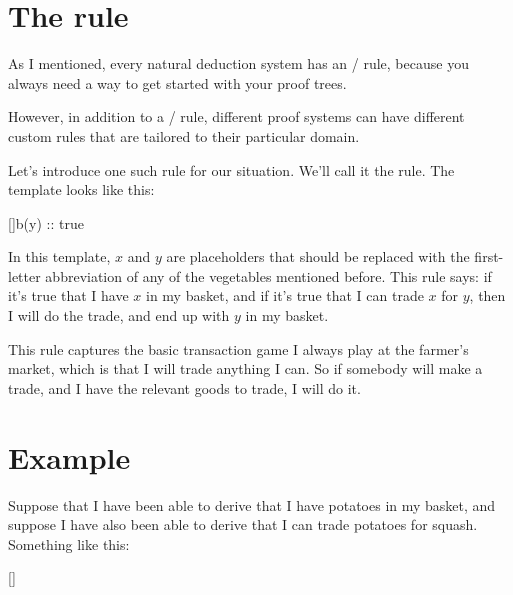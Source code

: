 \documentclass[../../../main.tex]{subfiles}
\begin{document}
\section{The  rule}

As I mentioned, every natural deduction system has an \startrule/ rule, because you always need a way to get started with your proof trees.

However, in addition to a \startrule/ rule, different proof systems can have different custom rules that are tailored to their particular domain. 

Let's introduce one such rule for our situation. We'll call it the  rule. The template looks like this:

\begin{prooftree*}
  []{b(y) :: true}
\end{prooftree*}

\noindent
In this template, $x$ and $y$ are placeholders that should be replaced with the first-letter abbreviation of any of the vegetables mentioned before. This rule says: if it's true that I have $x$ in my basket, and if it's true that I can trade $x$ for $y$, then I will do the trade, and end up with $y$ in my basket.

This rule captures the basic transaction game I always play at the farmer's market, which is that I will trade anything I can. So if somebody will make a trade, and I have the relevant goods to trade, I will do it.


\section{Example}

Suppose that I have been able to derive that I have potatoes in my basket, and suppose I have also been able to derive that I can trade potatoes for squash. Something like this:

\begin{prooftree*}
  \hypo{}
  \ellipsis{}{}

  \hypo{}
  \ellipsis{}{}  

  []{}
\end{prooftree*}
\end{document}
